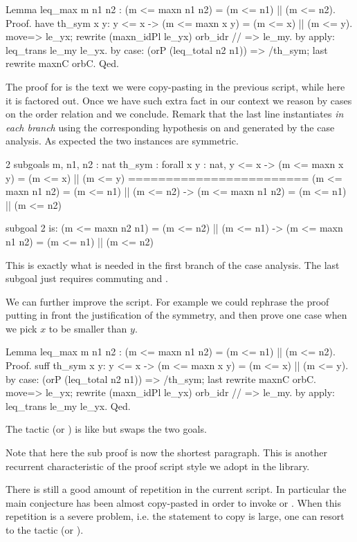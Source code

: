 \begin{coq}{}{}
Lemma leq_max m n1 n2 : (m <= maxn n1 n2) = (m <= n1) || (m <= n2).
Proof.
have th_sym x y: y <= x -> (m <= maxn x y) = (m <= x) || (m <= y).
  move=> le_yx; rewrite (maxn_idPl le_yx) orb_idr // => le_my.
  by apply: leq_trans le_my le_yx.
by case: (orP (leq_total n2 n1)) => /th_sym; last rewrite maxnC orbC.
Qed.
\end{coq}

The proof for  is the text we were copy-pasting in the
previous script, while here it is factored out.
Once we have such extra fact in our context we reason by cases on
the order relation and we conclude.  Remark that the last line instantiates
 \emph{in each branch} using the corresponding
hypothesis on  and  generated by the case analysis.
As expected the two instances are symmetric.

\begin{coqout}{}{}
2 subgoals
m, n1, n2 : nat
th_sym : forall x y : nat,
         y <= x -> (m <= maxn x y) = (m <= x) || (m <= y)
========================
(m <= maxn n1 n2) = (m <= n1) || (m <= n2) ->
(m <= maxn n1 n2) = (m <= n1) || (m <= n2)

subgoal 2 is:
(m <= maxn n2 n1) = (m <= n2) || (m <= n1) ->
(m <= maxn n1 n2) = (m <= n1) || (m <= n2)
\end{coqout}
This is exactly what is needed in the first branch of the case analysis.
The last subgoal just requires commuting  and \C{||}.

We can further improve the script.  For example we could rephrase
the proof putting in front the justification of the symmetry, and
then prove one case when we pick $x$ to be smaller than $y$.

\begin{coq}{}{}
Lemma leq_max m n1 n2 : (m <= maxn n1 n2) = (m <= n1) || (m <= n2).
Proof.
suff th_sym x y: y <= x -> (m <= maxn x y) = (m <= x) || (m <= y).
  by case: (orP (leq_total n2 n1)) => /th_sym; last rewrite maxnC orbC.
move=> le_yx; rewrite (maxn_idPl le_yx) orb_idr // => le_my.
by apply: leq_trans le_my le_yx.
Qed.
\end{coq}
The  tactic (or )
is like  but swaps the two goals.

Note that here the sub proof is now the shortest paragraph.
This is another recurrent characteristic of the proof script style
we adopt in the \mcbMC{} library.

There is still a good amount of repetition in the current script.
In particular the main conjecture has been almost copy-pasted in
order to invoke  or .  When this repetition
is a severe problem, i.e. the statement to copy is large, one
can resort to the  tactic (or ).

